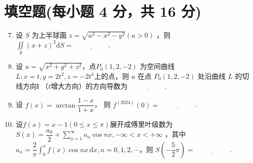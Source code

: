\documentclass[../main.tex]{subfiles}
\begin{document}
\section{填空题(每小题 4 分，共 16 分)}
\begin{enumerate}
  \setcounter{enumi}{6}
  \item 设 \( S \) 为上半球面 \( z=\sqrt{a^2-x^2-y^2}(a>0) \) ，则 \( \displaystyle \iint \limits_S \left( x+z \right)^2 \mathrm{d}S = \underline{\hspace{5em}} \).

  \item 设 \( u = \sqrt{x^2 + y^2 + z^2} \)，点\( P_0(1, 2, -2) \) 为空间曲线 \( L: x = t, y = 2t^2, z = -2t^4 \)上的点，则 \( u \) 在点 \( P_0(1,2,-2) \) 处沿曲线 \( L \) 的切线方向\( \boldsymbol{l} \) （$t$增大方向）的方向导数为  \(\underline{\hspace{5em}}\).

  \item 设 \( f(x)=\arctan{\dfrac{1-x}{1+x}} \)， 则 \( f^{(2024)}(0)= \underline{\hspace{5em}} \).

  \item 设$f(x)=x-1(0 \leq x \leq \pi)$展开成傅里叶级数为 \(S(x)=\dfrac{a_0}{2}+ \displaystyle \sum \limits_{n=1}^{\infty} a_n \cos{nx},-\infty<x<+\infty \) ，其中$a_n=\dfrac{2}{\pi}\displaystyle \int_0^{\pi} f(x)\cos{nx}\,\mathrm{d}x,n=0,1,2,\cdots$，则 \(S\left(-\dfrac{5}{2}\pi\right)=\underline{\hspace{5em}}\).
\end{enumerate}
\end{document}
